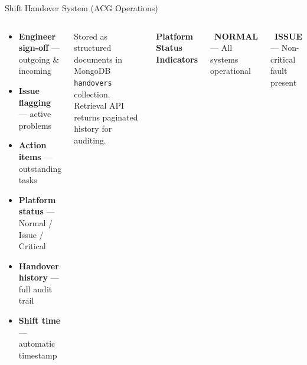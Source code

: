 \documentclass[aspectratio=169,12pt]{beamer}
\begin{document}
\begin{frame}{Shift Handover System (ACG Operations)}
\begin{columns}[t]
\begin{tcolorbox}[colback=AccentGold!10,colframe=AccentGold,arc=6pt,
  title={\faListAlt\ \textbf{Digital Shift Handover}},
  fonttitle=\bfseries\color{white},
  attach boxed title to top left={yshift=-2mm,xshift=4mm},
  boxed title style={colback=AccentGold!80!black}]
\small
\begin{itemize}\setlength\itemsep{5pt}
  \item[\faWrench]             \textbf{Engineer sign-off} --- outgoing \& incoming
  \item[\faExclamationCircle]  \textbf{Issue flagging} --- active problems
  \item[\faTasks]              \textbf{Action items} --- outstanding tasks
  \item[\faCircle]             \textbf{Platform status} --- Normal / Issue / Critical
  \item[\faHistory]            \textbf{Handover history} --- full audit trail
  \item[\faClock]              \textbf{Shift time} --- automatic timestamp
\end{itemize}
\end{tcolorbox}

\vspace{6pt}
\begin{tcolorbox}[colback=SlideGray,colframe=CardBorder,arc=4pt,
  left=4pt,right=4pt,top=3pt,bottom=3pt]
\scriptsize\centering\textcolor{TextMid}{Stored as structured documents in MongoDB \texttt{handovers} collection. Retrieval API returns paginated history for auditing.}
\end{tcolorbox}

\small\bfseries Platform Status Indicators

\vspace{8pt}
\begin{tcolorbox}[colback=SuccessGreen!10,colframe=SuccessGreen,arc=4pt,
  left=4pt,right=4pt,top=3pt,bottom=3pt]
\textcolor{SuccessGreen}{\faCircle}\ \textbf{NORMAL} --- All systems operational
\end{tcolorbox}

\vspace{4pt}
\begin{tcolorbox}[colback=WarningOrange!10,colframe=WarningOrange,arc=4pt,
  left=4pt,right=4pt,top=3pt,bottom=3pt]
\textcolor{WarningOrange}{\faCircle}\ \textbf{ISSUE} --- Non-critical fault present
\end{tcolorbox}


\end{columns}
\end{frame}
\end{document}
